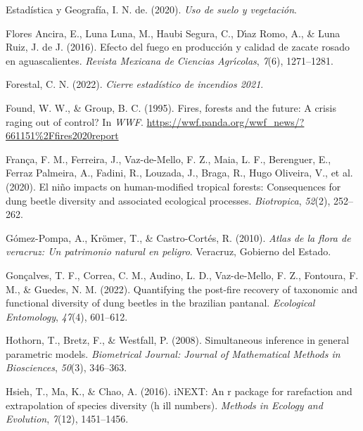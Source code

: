 \documentclass[
  11pt,
  a4paper]{book}
\newlength{\cslhangindent}
\newlength{\cslentryspacingunit} %
\newenvironment{CSLReferences}[2] %
 {%
  \setlength{\parindent}{0pt}
  \ifodd #1
  \let\oldpar\par
  \def\par{\hangindent=\cslhangindent\oldpar}
  \fi
  \setlength{\parskip}{#2\cslentryspacingunit}
 }%
 {}
\begin{document}
\begin{CSLReferences}{1}{0}
\leavevmode{}%
Estadística y Geografía, I. N. de. (2020). \emph{Uso de suelo y vegetación}.

\leavevmode{}%
Flores Ancira, E., Luna Luna, M., Haubi Segura, C., Dı́az Romo, A., \& Luna Ruiz, J. de J. (2016). Efecto del fuego en producci{ó}n y calidad de zacate rosado en aguascalientes. \emph{Revista Mexicana de Ciencias Agr{ı́}colas}, \emph{7}(6), 1271--1281.

\leavevmode{}%
Forestal, C. N. (2022). \emph{Cierre estadístico de incendios 2021}.

\leavevmode{}%
Found, W. W., \& Group, B. C. (1995). Fires, forests and the future: A crisis raging out of control? In \emph{WWF}. \url{https://wwf.panda.org/wwf_news/?661151\%2Ffires2020report}

\leavevmode{}%
França, F. M., Ferreira, J., Vaz-de-Mello, F. Z., Maia, L. F., Berenguer, E., Ferraz Palmeira, A., Fadini, R., Louzada, J., Braga, R., Hugo Oliveira, V., et al. (2020). El ni{ñ}o impacts on human-modified tropical forests: Consequences for dung beetle diversity and associated ecological processes. \emph{Biotropica}, \emph{52}(2), 252--262.

\leavevmode{}%
Gómez-Pompa, A., Krömer, T., \& Castro-Cortés, R. (2010). \emph{Atlas de la flora de veracruz: Un patrimonio natural en peligro}. Veracruz, Gobierno del Estado.

\leavevmode{}%
Gonçalves, T. F., Correa, C. M., Audino, L. D., Vaz-de-Mello, F. Z., Fontoura, F. M., \& Guedes, N. M. (2022). Quantifying the post-fire recovery of taxonomic and functional diversity of dung beetles in the brazilian pantanal. \emph{Ecological Entomology}, \emph{47}(4), 601--612.

\leavevmode{}%
Hothorn, T., Bretz, F., \& Westfall, P. (2008). Simultaneous inference in general parametric models. \emph{Biometrical Journal: Journal of Mathematical Methods in Biosciences}, \emph{50}(3), 346--363.

\leavevmode{}%
Hsieh, T., Ma, K., \& Chao, A. (2016). iNEXT: An r package for rarefaction and extrapolation of species diversity (h ill numbers). \emph{Methods in Ecology and Evolution}, \emph{7}(12), 1451--1456.


\end{CSLReferences}
\end{document}
